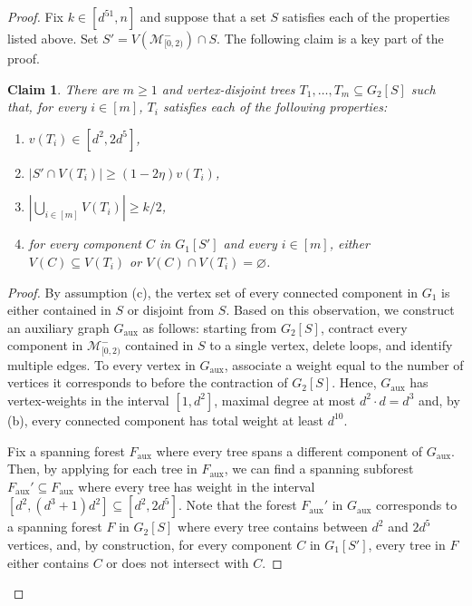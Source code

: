 \documentclass[reqno,final,a4paper]{amsart}
\newtheorem{claim}[thm]{Claim}
\theoremstyle{definition}
\newcommand{\cM}{\mathcal{M}}
\newcommand{\1}{\mathbbm{1}}
\begin{document}
\begin{proof}
Fix $k\in [d^{51},n]$ and suppose that a set $S$ satisfies each of the properties listed above. 
Set $S'=V(\cM_{[0,2)}^-)\cap S$.
The following claim is a key part of the proof.

\begin{claim}\label{claim: no sudden collapse help}
There are $m\ge 1$ and vertex-disjoint trees $T_1,\ldots, T_m\subseteq G_2[S]$ such that, for every $i\in [m]$, $T_i$ satisfies each of the following properties:
\begin{enumerate}[label=\emph{(\arabic*)}]
    \item $v(T_i)\in [d^2,2d^5]$,
    \item $|S'\cap V(T_i)|\ge (1-2\eta)v(T_i)$,\label{i: intersection in collapse}
    \item $|\bigcup_{i\in [m]} V(T_i)|\ge k/2$,
    \item for every component $C$ in $G_1[S']$ and every $i\in [m]$, either $V(C)\subseteq V(T_i)$ or $V(C)\cap V(T_i)=\varnothing$. \label{i: components in collapse}
\end{enumerate}
\end{claim}
\begin{proof}
By assumption (c), the vertex set of every connected component in $G_1$ is either contained in $S$ or disjoint from $S$.
Based on this observation, we construct an auxiliary graph $G_{\mathrm{aux}}$ as follows: starting from $G_2[S]$, contract every component in $\cM_{[0,2)}^-$ contained in $S$ to a single vertex, delete loops, and identify multiple edges.
To every vertex in $G_{\mathrm{aux}}$, associate a weight equal to the number of vertices it corresponds to before the contraction of $G_2[S]$. 
Hence, $G_{\mathrm{aux}}$ has vertex-weights in the interval $[1,d^2]$, maximal degree at most $d^2\cdot d = d^3$ and, by (b), every connected component has total weight at least $d^{10}$.

Fix a spanning forest $F_{\mathrm{aux}}$ where every tree spans a different component of $G_{\mathrm{aux}}$.
Then, by applying  for each tree in $F_{\mathrm{aux}}$, we can find a spanning subforest $F_{\mathrm{aux}}'\subseteq F_{\mathrm{aux}}$ where every tree has weight in the interval $[d^2,(d^3+1)d^2]\subseteq [d^2,2d^5]$. 
Note that the forest $F_{\mathrm{aux}}'$ in $G_{\mathrm{aux}}$ corresponds to a spanning forest $F$ in $G_2[S]$ where every tree contains between $d^2$ and $2d^5$ vertices, and, by construction, for every component $C$ in $G_1[S']$, every tree in $F$ either contains $C$ or does not intersect with $C$.


\end{proof}
\end{proof}
\end{document}
